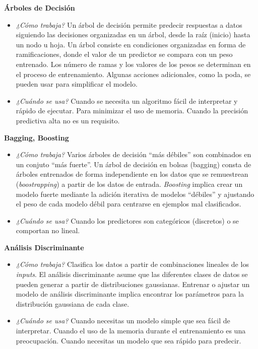 \documentclass[]{book}
\begin{document}
\textbf{Árboles de Decisión}

\begin{itemize}
\item
  \emph{¿Cómo trabaja?} Un árbol de decisión permite predecir respuestas a datos siguiendo
  las decisiones organizadas en un árbol, desde la raíz (inicio) hasta un nodo u hoja. Un árbol consiste en condiciones organizadas en forma de ramificaciones, donde el valor de un predictor se compara con un peso entrenado. Los número de ramas y los valores de los pesos se determinan
  en el proceso de entrenamiento. Algunas acciones adicionales, como la poda, se pueden usar para simplificar el modelo.
\item
  \emph{¿Cuándo se usa?} Cuando se necesita un algoritmo fácil de interpretar y
  rápido de ejecutar. Para minimizar el uso de memoria. Cuando la precisión predictiva alta no es un requisito.
\end{itemize}

\textbf{Bagging, Boosting}

\begin{itemize}
\item
  \emph{¿Cómo trabaja?} Varios árboles de decisión ``más débiles'' son
  combinados en un conjuto ``más fuerte''. Un árbol de decisión en bolsas (bagging) consta de árboles entrenados
  de forma independiente en los datos que se remuestrean (\emph{boostrapping}) a partir de los datos de entrada. \emph{Boosting} implica crear un modelo fuerte mediante la adición iterativa de modelos ``débiles'' y ajustando el peso de cada modelo débil para centrarse en ejemplos mal clasificados.
\item
  \emph{¿Cuándo se usa?} Cuando los predictores son categóricos (discretos) o se comportan
  no lineal.
\end{itemize}

\textbf{Análisis Discriminante}

\begin{itemize}
\item
  \emph{¿Cómo trabaja?} Clasifica los datos a partir de combinaciones lineales de los \emph{inputs}. El análisis discriminante asume que las diferentes clases de datos se pueden generar a partir de distribuciones gaussianas. Entrenar o ajustar un modelo de análisis discriminante implica encontrar los parámetros para la distribución gaussiana de cada clase.
\item
  \emph{¿Cuándo se usa?} Cuando necesitas un modelo simple que sea fácil de interpretar. Cuando el uso de la memoria durante el entrenamiento es una preocupación. Cuando necesitas un modelo que sea rápido para predecir.
\end{itemize}
\end{document}
